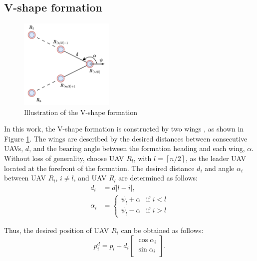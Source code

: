 \subsection{V-shape formation}
\begin{figure}
    \centering
    \includegraphics[width=0.4\textwidth]{paper1/images/v-shape.pdf}
    \caption{Illustration of the V-shape formation}
    \label{fig:chap2_vshape}
\end{figure}
In this work, the V-shape formation is constructed by two wings \cite{Dang2019}, as shown in Figure \ref{fig:chap2_vshape}. The wings are described by the desired distances between consecutive UAVs, $d$, and the bearing angle between the formation heading and each wing, $\alpha$. Without loss of generality, choose UAV $R_l$, with $l=\left\lceil{n}/{2}\right\rceil$, as the leader UAV located at the forefront of the formation. The desired distance $d_i$ and angle $\alpha_i$ between UAV $R_i$, $i\neq l$, and UAV $R_l$ are determined as follows:
\begin{equation}
\begin{aligned}
    d_i&=d\left\vert l-i\right\vert,\\
    \alpha_{i}&=\left\{ \begin{array}{cc}
\psi_{l}+\alpha & \text{if }i<l\\
\psi_{l}-\alpha & \text{if }i>l
\end{array}\right.
\end{aligned}
\label{eqn:chap2_desired}
\end{equation}

Thus, the desired position of UAV $R_i$ can be obtained as follows:
\begin{equation}
    p_i^d=p_l+d_i\left[\begin{array}{c}
\cos\alpha_{i}\\
\sin\alpha_{i}
\end{array}\right].
\label{eqn:chap2_desired_pose}
\end{equation}